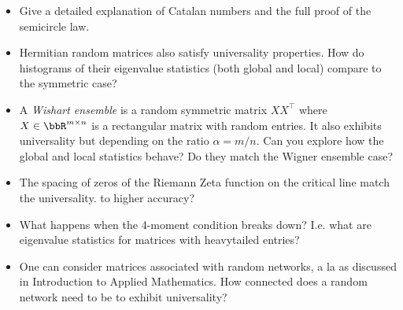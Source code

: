 \begin{itemize}
\item[1. ] Give a detailed explanation of Catalan numbers and the full proof of the semicircle law.


\item[2. ] Hermitian random matrices also satisfy universality properties. How do histograms of their eigenvalue statistics (both global and local) compare to the symmetric case?


\item[3. ] A \emph{Wishart ensemble} is a random symmetric matrix $X X^\ensuremath{\top}$ where $X \ensuremath{\in} \ensuremath{\bbR}^{m \ensuremath{\times} n}$ is a rectangular matrix with random entries. It also exhibits universality but depending on the ratio $\ensuremath{\alpha} = m/n$. Can you explore how the global and local statistics behave? Do they match the Wigner ensemble case?


\item[4. ] The spacing of zeros of the Riemann Zeta function on the critical line match the universality. to higher accuracy?


\item[5. ] What happens when the 4-moment condition breaks down? I.e. what are eigenvalue statistics for matrices with heavytailed entries?


\item[6. ] One can consider matrices associated with random networks, a la as discussed in Introduction to Applied Mathematics. How connected does a random network need to be to exhibit universality?

\end{itemize}

